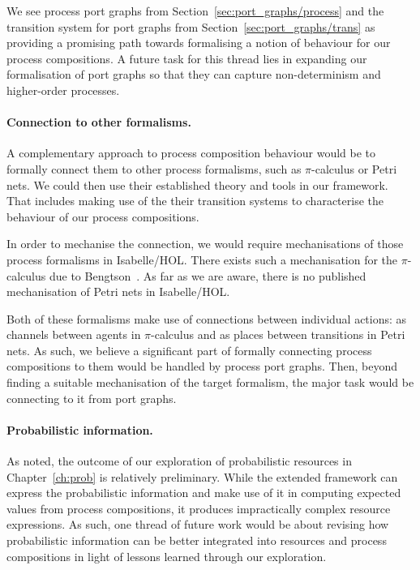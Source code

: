 \documentclass[class=smolathesis,crop=false]{standalone}
\begin{document}
We see process port graphs from Section~\ref{sec:port_graphs/process} and the transition system for port graphs from Section~\ref{sec:port_graphs/trans} as providing a promising path towards formalising a notion of behaviour for our process compositions.
A future task for this thread lies in expanding our formalisation of port graphs so that they can capture non-determinism and higher-order processes.

\paragraph*{Connection to other formalisms.}
A complementary approach to process composition behaviour would be to formally connect them to other process formalisms, such as $\pi$-calculus or Petri nets.
We could then use their established theory and tools in our framework.
That includes making use of the their transition systems to characterise the behaviour of our process compositions.

In order to mechanise the connection, we would require mechanisations of those process formalisms in Isabelle/HOL.
There exists such a mechanisation for the $\pi$-calculus due to Bengtson~\cite{Pi_Calculus-AFP}.
As far as we are aware, there is no published mechanisation of Petri nets in Isabelle/HOL.

Both of these formalisms make use of connections between individual actions: as channels between agents in $\pi$-calculus and as places between transitions in Petri nets.
As such, we believe a significant part of formally connecting process compositions to them would be handled by process port graphs.
Then, beyond finding a suitable mechanisation of the target formalism, the major task would be connecting to it from port graphs.

\paragraph*{Probabilistic information.}
As noted, the outcome of our exploration of probabilistic resources in Chapter~\ref{ch:prob} is relatively preliminary.
While the extended framework can express the probabilistic information and make use of it in computing expected values from process compositions, it produces impractically complex resource expressions.
As such, one thread of future work would be about revising how probabilistic information can be better integrated into resources and process compositions in light of lessons learned through our exploration.
\end{document}
